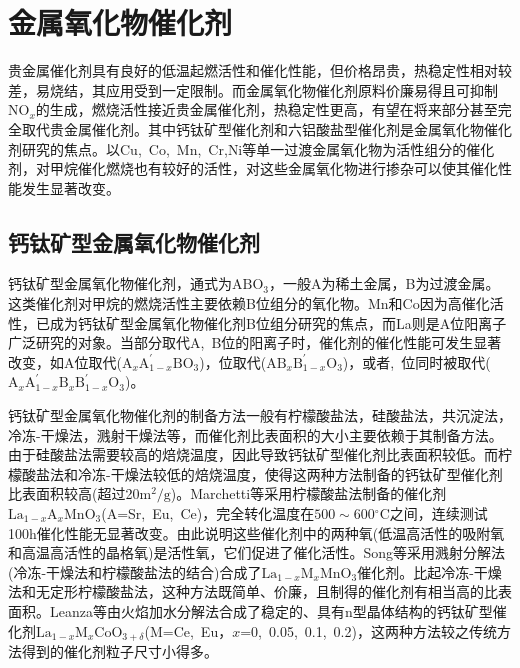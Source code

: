 \section{金属氧化物催化剂}
贵金属催化剂具有良好的低温起燃活性和催化性能，但价格昂贵，热稳定性相对较差，易烧结，其应用受到一定限制。而金属氧化物催化剂原料价廉易得且可抑制$\mathrm{NO}_x$的生成，燃烧活性接近贵金属催化剂，热稳定性更高，有望在将来部分甚至完全取代贵金属催化剂。其中钙钛矿型催化剂和六铝酸盐型催化剂是金属氧化物催化剂研究的焦点。以\textrm{Cu},~\textrm{Co},~\textrm{Mn},~\textrm{Cr},\textrm{Ni}等单一过渡金属氧化物为活性组分的催化剂，对甲烷催化燃烧也有较好的活性，对这些金属氧化物进行掺杂可以使其催化性能发生显著改变。

\subsection{钙钛矿型金属氧化物催化剂}
钙钛矿型金属氧化物催化剂，通式为$\mathrm{ABO}_3$，一般\textrm{A}为稀土金属，\textrm{B}为过渡金属。这类催化剂对甲烷的燃烧活性主要依赖\textrm{B}位组分的氧化物。\textrm{Mn}\cite{ACB24-193_2000}和\textrm{Co}因为高催化活性，已成为钙钛矿型金属氧化物催化剂B位组分研究的焦点，而\textrm{La}\cite{ACA262-167_2004}则是\textrm{A}位阳离子广泛研究的对象。当部分取代\textrm{A},~\textrm{B}位的阳离子时，催化剂的催化性能可发生显著改变，如\textrm{A}位取代($\mathrm{A}_x\mathrm{A}^{\prime}_{1-x}\mathrm{BO}_3$)，位取代($\mathrm{AB}_x\mathrm{B}^{\prime}_{1-x}\mathrm{O}_3$)，或者,~位同时被取代($\mathrm{A}_x\mathrm{A}^{\prime}_{1-x}\mathrm{B}_x\mathrm{B}^{\prime}_{1-x}\mathrm{O}_3$)。

钙钛矿型金属氧化物催化剂的制备方法一般有柠檬酸盐法，硅酸盐法，共沉淀法，冷冻-干燥法，溅射干燥法等，而催化剂比表面积的大小主要依赖于其制备方法。由于硅酸盐法需要较高的焙烧温度，因此导致钙钛矿型催化剂比表面积较低。而柠檬酸盐法和冷冻-干燥法较低的焙烧温度，使得这两种方法制备的钙钛矿型催化剂比表面积较高(超过20$\mathrm{m}^2/\mathrm{g}$)。\textrm{Marchetti}等\cite{ACB15-179_1998}采用柠檬酸盐法制备的催化剂$\mathrm{La}_{1-x}\mathrm{A}_x\mathrm{MnO}_3$(\textrm{A=Sr,~Eu,~Ce})，完全转化温度在$500\sim$600$^{\circ}\mathrm{C}$之间，连续测试100\textrm{h}催化性能无显著改变。由此说明这些催化剂中的两种氧(低温高活性的吸附氧和高温高活性的晶格氧)是活性氧，它们促进了催化活性。\textrm{Song}等\cite{CataT47-155_1999}采用溅射分解法(冷冻-干燥法和柠檬酸盐法的结合)合成了$\mathrm{La}_{1-x}\mathrm{M}_x\mathrm{MnO}_3$催化剂。比起冷冻-干燥法和无定形柠檬酸盐法，这种方法既简单、价廉，且制得的催化剂有相当高的比表面积。\textrm{Leanza}等\cite{ACB28-55_2000}由火焰加水分解法合成了稳定的、具有\textrm{n}型晶体结构的钙钛矿型催化剂$\mathrm{La}_{1-x}\mathrm{M}_x\mathrm{CoO}_{3+\delta}$(\textrm{M=Ce,~Eu}，$x$=0,~0.05,~0.1,~0.2)，这两种方法较之传统方法得到的催化剂粒子尺寸小得多。

